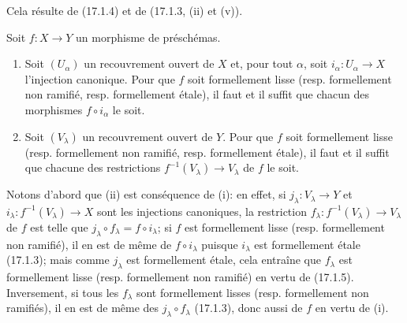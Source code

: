 Cela résulte de (17.1.4) et de (17.1.3, (ii) et (v)).

\begin{proposition}[17.1.6]
\label{IV.17.1.6}
Soit $f:X\to Y$ un morphisme de préschémas.
\begin{enumerate}
  \item[(i)] Soit $(U_\alpha)$ un recouvrement ouvert de $X$ et, pour tout $\alpha$, soit $i_\alpha:U_\alpha\to X$ l'injection canonique. Pour que $f$ soit formellement lisse (resp. formellement non ramifié, resp. formellement étale), il faut et il suffit que chacun des morphismes $f\circ i_\alpha$ le soit.
  \item[(ii)] Soit $(V_\lambda)$ un recouvrement ouvert de $Y$. Pour que $f$ soit formellement lisse (resp. formellement non ramifié, resp. formellement étale), il faut et il suffit que chacune des restrictions $f^{-1}(V_\lambda)\to V_\lambda$ de $f$ le soit.
\end{enumerate}
\end{proposition}

Notons d'abord que (ii) est conséquence de (i): en effet, si $j_\lambda:V_\lambda\to Y$ et $i_\lambda:f^{-1}(V_\lambda)\to X$ sont les injections canoniques, la restriction $f_\lambda:f^{-1}(V_\lambda)\to V_\lambda$ de $f$ est telle que $j_\lambda\circ f_\lambda=f\circ i_\lambda$; si $f$ est formellement lisse (resp. formellement non ramifié), il en est de même de $f\circ i_\lambda$ puisque $i_\lambda$ est formellement étale (17.1.3); mais comme $j_\lambda$ est formellement étale, cela entraîne que $f_\lambda$ est formellement lisse (resp. formellement non ramifié) en vertu de (17.1.5). Inversement, si tous les $f_\lambda$ sont formellement lisses (resp. formellement non ramifiés), il en est de même des $j_\lambda\circ f_\lambda$ (17.1.3), donc aussi de $f$ en vertu de (i).


